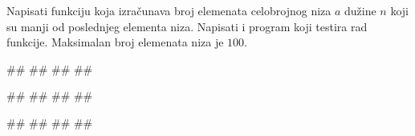 \begin{Exercise}[label=p.broj_manjih_od_poslednjeg] 
 Napisati funkciju  koja
 izračunava broj elemenata celobrojnog niza $a$ dužine $n$ koji su
 manji od poslednjeg elementa niza. Napisati i program koji testira
 rad funkcije. Maksimalan broj elemenata niza je $100$.
 
\begin{miditest}
\begin{upotreba}{1}
#\naslovInt#
##
##
##
\end{upotreba}
\end{miditest}
\begin{miditest}
\begin{upotreba}{2}
#\naslovInt#
##
##
##
\end{upotreba}
\end{miditest}

\begin{miditest}
\begin{upotreba}{3}
#\naslovInt#
##
##
##
\end{upotreba}
\end{miditest}

\end{Exercise}

\ifresenja
\begin{Answer}[ref=p.broj_manjih_od_poslednjeg]
\end{Answer}
\fi

